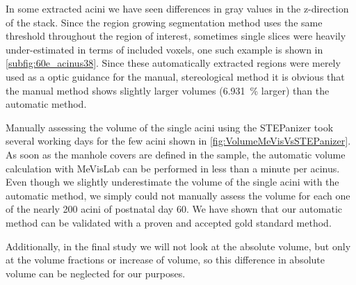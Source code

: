 \documentclass[%
	paper=a4,%
	abstract=true,%
	]{scrartcl}
\begin{document}
In some extracted acini we have seen differences in gray values in the z-direction of the stack. Since the region growing segmentation method uses the same threshold throughout the region of interest, sometimes single slices were heavily under-estimated in terms of included voxels, one such example is shown in \autoref{subfig:60e_acinus38}. Since these automatically extracted regions were merely used as a optic guidance for the manual, stereological method it is obvious that the manual method shows slightly larger volumes (\SI{6.931}{\percent} larger) than the automatic method.

Manually assessing the volume of the single acini using the STEPanizer took several working days for the few acini shown in \autoref{fig:VolumeMeVisVsSTEPanizer}. As soon as the manhole covers are defined in the sample, the automatic volume calculation with MeVisLab can be performed in less than a minute per acinus. Even though we slightly underestimate the volume of the single acini with the automatic method, we simply could not manually assess the volume for each one of the nearly 200 acini of postnatal day 60. We have shown that our automatic method can be validated with a proven and accepted gold standard method.

Additionally, in the final study we will not look at the absolute volume, but only at the volume fractions or increase of volume, so this difference in absolute volume can be neglected for our purposes.
\end{document}
